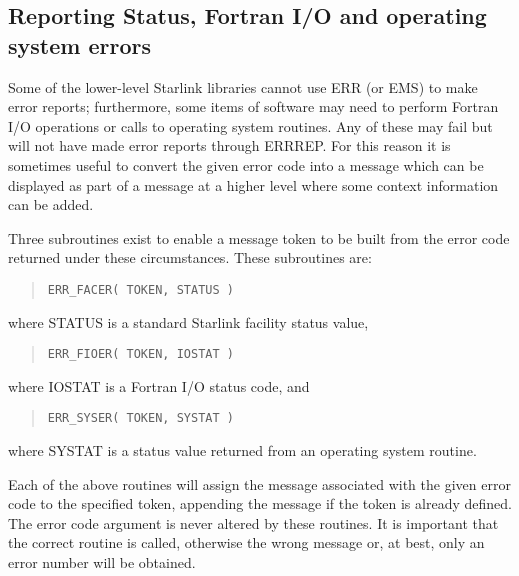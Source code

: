 \documentclass[twoside,11pt]{article}
\newcommand{\xlabel}[1]{}
\renewcommand{\_}{\texttt{\symbol{95}}}
\begin{document}
\subsection{\xlabel{reporting_status_fortran_io_and_operating_system_error}Reporting Status, Fortran I/O and operating system errors
\label{fio_sect}}
Some of the lower-level Starlink libraries cannot use ERR (or EMS) to make
error reports; furthermore, some items of software may need to perform Fortran
I/O operations or calls to operating system routines. Any of these may fail
but will not have made error reports through ERR\_REP.
For this reason it is sometimes useful to convert the given error code into
a message which can be displayed as part of a message at a higher level where
some context information can be added.

Three subroutines exist to enable a message token to be built from
the error code returned under these circumstances.
These subroutines are:

\begin {quote}
\begin {small}
\begin{verbatim}
ERR_FACER( TOKEN, STATUS )
\end{verbatim}
\end {small}
\end {quote}
where STATUS is a standard Starlink facility status value,
\begin {quote}
\begin {small}
\begin{verbatim}
ERR_FIOER( TOKEN, IOSTAT )
\end{verbatim}
\end {small}
\end {quote}
where IOSTAT is a Fortran I/O status code, and
\begin {quote}
\begin {small}
\begin{verbatim}
ERR_SYSER( TOKEN, SYSTAT )
\end{verbatim}
\end {small}
\end {quote}
where SYSTAT is a status value returned from an operating system routine.

Each of the above routines will assign the message associated with the given
error code to the specified token, appending the message if the token is already
defined. The error code argument is never altered by these routines.
It is important that the correct routine is called, otherwise the wrong message
or, at best, only an error number will be obtained.
\end{document}
